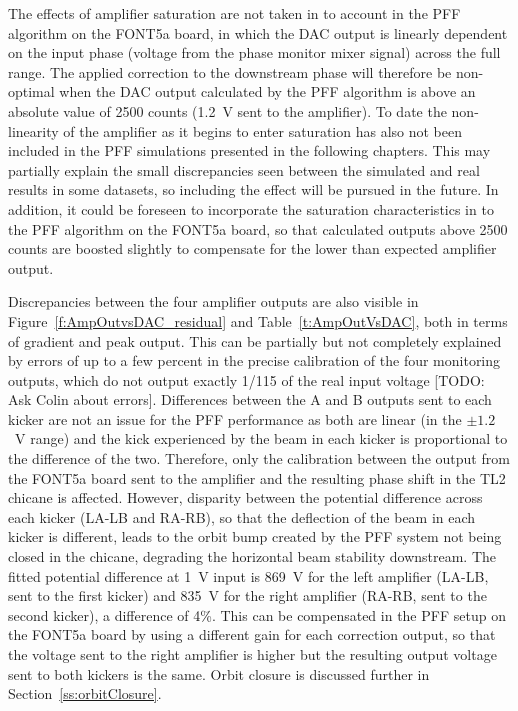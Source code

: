 The effects of amplifier saturation are not taken in to account in the PFF algorithm on the FONT5a board, in which the DAC output is linearly dependent on the input phase (voltage from the phase monitor mixer signal) across the full range. The applied correction to the downstream phase will therefore be non-optimal when the DAC output calculated by the PFF algorithm is above an absolute value of 2500 counts (1.2~V sent to the amplifier). To date the non-linearity of the amplifier as it begins to enter saturation has also not been included in the PFF simulations presented in the following chapters. This may partially explain the small discrepancies seen between the simulated and real results in some datasets, so including the effect will be pursued in the future. In addition, it could be foreseen to incorporate the saturation characteristics in to the PFF algorithm on the FONT5a board, so that calculated outputs above 2500 counts are boosted slightly to compensate for the lower than expected amplifier output.

Discrepancies between the four amplifier outputs are also visible in Figure~\ref{f:AmpOutvsDAC_residual} and Table~\ref{t:AmpOutVsDAC}, both in terms of gradient and peak output. This can be partially but not completely explained by errors of up to a few percent in the precise calibration of the four monitoring outputs, which do not output exactly 1/115 of the real input voltage [TODO: Ask Colin about errors]. Differences between the A and B outputs sent to each kicker are not an issue for the PFF performance as both are linear (in the \(\pm1.2\)~V range) and the kick experienced by the beam in each kicker is proportional to the difference of the two. Therefore, only the calibration between the output from the FONT5a board sent to the amplifier and the resulting phase shift in the TL2 chicane is affected. However, disparity between the potential difference across each kicker (LA-LB and RA-RB), so that the deflection of the beam in each kicker is different, leads to the orbit bump created by the PFF system not being closed in the chicane, degrading the horizontal beam stability downstream. The fitted potential difference at 1~V input is 869~V for the left amplifier (LA-LB, sent to the first kicker) and 835~V for the right amplifier (RA-RB, sent to the second kicker), a difference of 4\%. This can be compensated in the PFF setup on the FONT5a board by using a different gain for each correction output, so that the voltage sent to the right amplifier is higher but the resulting output voltage sent to both kickers is the same. Orbit closure is discussed further in Section~\ref{ss:orbitClosure}.


